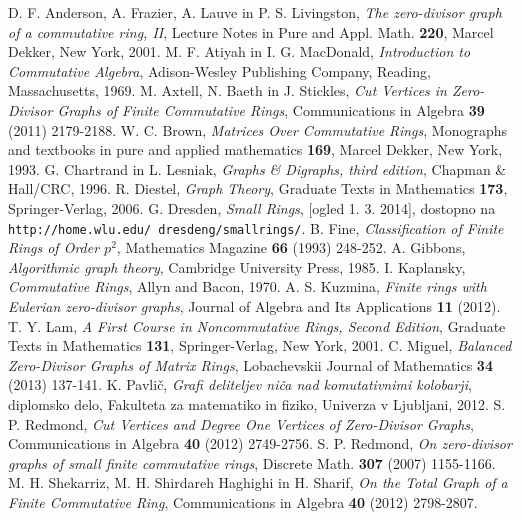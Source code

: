 \documentclass[a4paper, 12pt]{amsart}
\theoremstyle{definition} %
\theoremstyle{plain} %
\begin{document}
\begin{thebibliography}{99}
 D. F. Anderson, A. Frazier, A. Lauve in P. S. Livingston, \emph{The zero-divisor graph of a commutative ring, II}, Lecture Notes in Pure and Appl. Math. {\bf 220}, Marcel Dekker, New York, 2001.
M. F. Atiyah in I. G. MacDonald, \emph{Introduction to Commutative Algebra}, Adison-Wesley Publishing Company, Reading, Massachusetts, 1969.
 M. Axtell, N. Baeth in J. Stickles, \emph{Cut Vertices in Zero-Divisor Graphs of Finite Commutative Rings}, Communications in Algebra {\bf 39} (2011) 2179-2188.
 W. C. Brown, \emph{Matrices Over Commutative Rings}, Monographs and textbooks in pure and applied mathematics {\bf 169}, Marcel Dekker, New York, 1993.
G. Chartrand in L. Lesniak, \emph{Graphs \& Digraphs, third edition}, Chapman \& Hall/CRC,  1996.
R. Diestel, \emph{Graph Theory}, Graduate Texts in Mathematics {\bf 173}, Springer-Verlag, 2006.
 G. Dresden, \emph{Small Rings}, [ogled 1. 3. 2014], dostopno na \texttt{http://home.wlu.edu/~dresdeng/smallrings/}.
B. Fine, \emph{Classification of Finite Rings of Order $p^2$}, Mathematics Magazine {\bf 66} (1993) 248-252. 
A. Gibbons, \emph{Algorithmic graph theory}, Cambridge University Press, 1985.
I. Kaplansky, \emph{Commutative Rings}, Allyn and Bacon, 1970.
A. S. Kuzmina, \emph{Finite rings with Eulerian zero-divisor graphs}, Journal of Algebra and Its Applications {\bf 11} (2012).
 T. Y. Lam, \emph{A First Course in Noncommutative Rings, Second Edition}, Graduate Texts in Mathematics {\bf 131}, Springer-Verlag, New York, 2001.
C. Miguel, \emph{Balanced Zero-Divisor Graphs of Matrix Rings}, Lobachevskii Journal of Mathematics {\bf 34} (2013) 137-141.
K. Pavlič, \emph{Grafi deliteljev niča nad komutativnimi kolobarji}, diplomsko delo, Fakulteta za matematiko in fiziko, Univerza v Ljubljani, 2012.
 S. P. Redmond, \emph{Cut Vertices and Degree One Vertices of Zero-Divisor Graphs}, Communications in Algebra {\bf 40} (2012) 2749-2756.
 S. P. Redmond, \emph{On zero-divisor graphs of small finite commutative rings}, Discrete Math. {\bf 307} (2007) 1155-1166.
 M. H. Shekarriz, M. H. Shirdareh Haghighi in H.  Sharif, \emph{On the Total Graph of a Finite Commutative Ring}, Communications in Algebra {\bf 40} (2012) 2798-2807.
\end{thebibliography}
\end{document}
